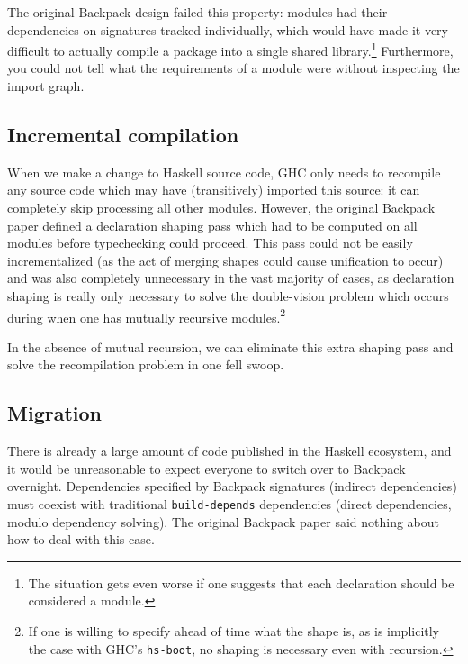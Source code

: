The original Backpack design failed this property: modules had
their dependencies on signatures tracked individually, which would have
made it very difficult to actually compile a package into a single
shared library.\footnote{The situation gets even worse if one suggests
that each declaration should be considered a module.}  Furthermore, you
could not tell what the requirements of a module were without inspecting
the import graph.

\subsection{Incremental compilation}

When we make a change to Haskell source code, GHC only needs to recompile
any source code which may have (transitively) imported this source:
it can completely skip processing all other modules.  However, the
original Backpack paper defined a declaration shaping pass which had
to be computed on all modules before typechecking could proceed.  This
pass could not be easily incrementalized (as the act of merging shapes
could cause unification to occur) and was also completely unnecessary
in the vast majority of cases, as declaration shaping is really only
necessary to solve the double-vision problem which occurs during when
one has mutually recursive modules.\footnote{If one is willing to
specify ahead of time what the shape is, as is implicitly the case with GHC's
\texttt{hs-boot}, no shaping is necessary even with recursion.}

In the absence of mutual recursion, we can eliminate this extra shaping
pass and solve the recompilation problem in one fell swoop.


\subsection{Migration}

There is already a large amount of code published in the Haskell
ecosystem, and it would be unreasonable to expect everyone to switch
over to Backpack overnight.  Dependencies specified by Backpack
signatures (indirect dependencies) must coexist with traditional
\verb|build-depends| dependencies (direct dependencies, modulo
dependency solving).  The original Backpack paper said nothing about
how to deal with this case.
